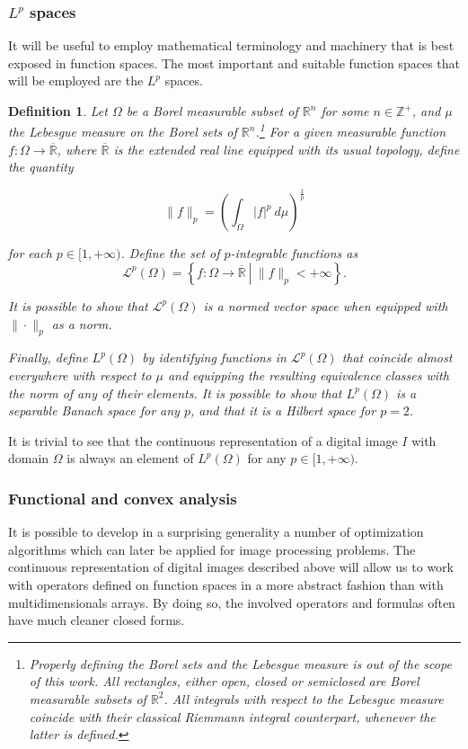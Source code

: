 \documentclass[twocolumn,twoside,a4paper,10pt]{IEEEtran}
\newtheorem{definition}{Definition}
\begin{document}
\subsubsection{\(L^p\) spaces}
It will be useful to employ mathematical terminology and machinery that is best exposed in function spaces. The most important and suitable function spaces that will be employed are the \(L^p\) spaces.

\begin{definition}
  Let \(\Omega\) be a Borel measurable subset of \(\mathbb{R}^n\) for some \(n\in \mathbb{Z}^+\), and \(\mu\) the Lebesgue measure on the Borel sets of \(\mathbb{R}^n\).\footnote{Properly defining the Borel sets and the Lebesgue measure is out of the scope of this work. All rectangles, either open, closed or semiclosed are Borel measurable subsets of \(\mathbb{R}^2\). All integrals with respect to the Lebesgue measure coincide with their classical Riemmann integral counterpart, whenever the latter is defined.} For a given measurable function \(f\colon \Omega\to \overline{\mathbb{R}}\), where \(\overline{\mathbb{R}}\) is the extended real line equipped with its usual topology, define the quantity

  \[
    \|f\|_{p} = \left(\int_{\Omega}|f|^p~d\mu\right)^{\frac 1p}
  \]

  for each \(p\in[1, +\infty)\). Define the set of \(p\)-integrable functions as 
  \[
    \mathcal{L}^p(\Omega) = \left\{f\colon\Omega\to \mathbb{\overline{R}}~\left|~\|f\|_{p}<+\infty\right.\right\}
  .\]

  It is possible to show that \(\mathcal{L}^p(\Omega)\) is a normed vector space when equipped with \(\|\cdot\|_{p}\) as a norm.

  Finally, define \(L^p(\Omega)\) by identifying functions in \(\mathcal{L}^p(\Omega)\) that coincide almost everywhere with respect to \(\mu\) and equipping the resulting equivalence classes with the norm of any of their elements. It is possible to show that \(L^p(\Omega)\) is a separable Banach space for any \(p\), and that it is a Hilbert space for \(p=2\).
\end{definition}

It is trivial to see that the continuous representation of a digital image \(I\) with domain \(\Omega\) is always an element of \(L^p(\Omega)\) for any \(p\in[1, +\infty)\).

\subsubsection{Functional and convex analysis} It is possible to develop in a surprising generality a number of optimization algorithms which can later be applied for image processing problems. The continuous representation of digital images described above will allow us to work with operators defined on function spaces in a more abstract fashion than with multidimensionals arrays. By doing so, the involved operators and formulas often have much cleaner closed forms.
\end{document}
